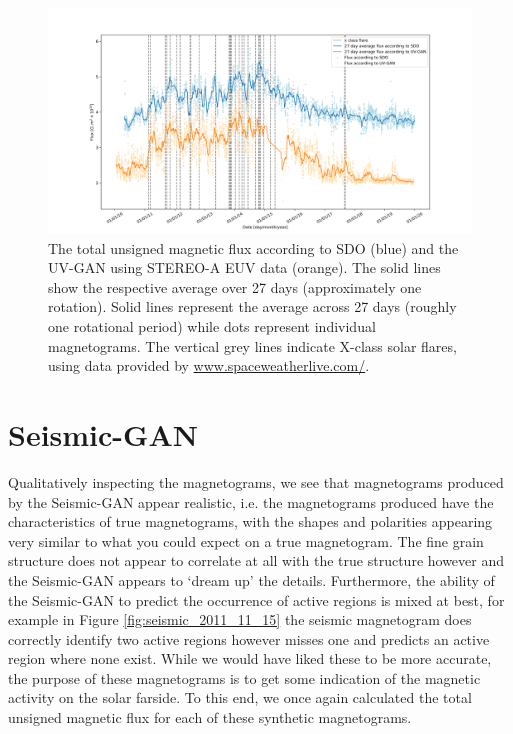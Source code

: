 \documentclass[11pt,a4paper,onecolumn]{report}
\begin{document}
\begin{figure}[t]
  \centering
  \includegraphics[width=\linewidth]{Flux_SDO_UV-GAN_average.png}

  \caption{The total unsigned magnetic flux according to SDO (blue) and the
  UV-GAN using STEREO-A EUV data (orange). The solid lines show the respective
  average over 27 days (approximately one rotation). Solid lines represent the
  average across 27 days (roughly one rotational period) while dots represent
  individual magnetograms. The vertical grey lines indicate X-class solar
  flares, using data provided by \url{www.spaceweatherlive.com/}.}
  \label{fig:flux_sdo_uv}
\end{figure}

\section{Seismic-GAN}
Qualitatively inspecting the magnetograms, we see that magnetograms produced by
the Seismic-GAN appear realistic, i.e. the magnetograms produced have the
characteristics of true magnetograms, with the shapes and polarities appearing
very similar to what you could expect on a true magnetogram. The fine grain
structure does not appear to correlate at all with the true structure however
and the Seismic-GAN appears to `dream up' the details. Furthermore, the
ability of the Seismic-GAN to predict the occurrence of active regions is mixed
at best, for example in Figure \ref{fig:seismic_2011_11_15} the seismic
magnetogram does correctly identify two active regions however misses one and
predicts an active region where none exist. While we would have liked these to
be more accurate, the purpose of these magnetograms is to get some indication of
the magnetic activity on the solar farside. To this end, we once again
calculated the total unsigned magnetic flux for each of these synthetic
magnetograms.\\
\end{document}
